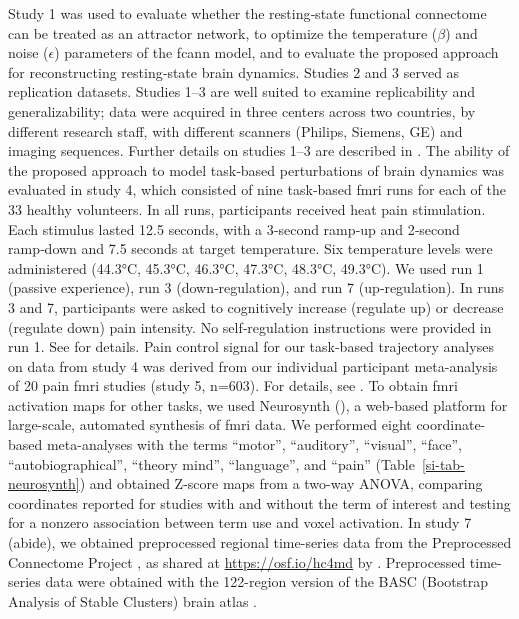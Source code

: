 \documentclass{article}
\begin{document}
Study 1 was used to evaluate whether the resting‑state functional connectome can be treated as an attractor network, to optimize the temperature ($\beta$) and noise ($\epsilon$) parameters of the \acrshort{fcann} model, and to evaluate the proposed approach for reconstructing resting‑state brain dynamics. Studies 2 and 3 served as replication datasets. Studies 1--3 are well suited to examine replicability and generalizability; data were acquired in three centers across two countries, by different research staff, with different scanners (Philips, Siemens, GE) and imaging sequences. Further details on studies 1--3 are described in \cite{Spisak2020Pain}. The ability of the proposed approach to model task‑based perturbations of brain dynamics was evaluated in study 4, which consisted of nine task‑based \acrshort{fmri} runs for each of the 33 healthy volunteers. In all runs, participants received heat pain stimulation. Each stimulus lasted 12.5 seconds, with a 3‑second ramp‑up and 2‑second ramp‑down and 7.5 seconds at target temperature. Six temperature levels were a\acrshort{dm}inistered (44.3°C, 45.3°C, 46.3°C, 47.3°C, 48.3°C, 49.3°C). We used run 1 (passive experience), run 3 (down‑regulation), and run 7 (up‑regulation). In runs 3 and 7, participants were asked to cognitively increase (regulate up) or decrease (regulate down) pain intensity. No self‑regulation instructions were provided in run 1. See \citet{woo2015distinct} for details.
Pain control signal for our task-based trajectory analyses on data from study 4 was derived from our individual participant meta-analysis of 20 pain \acrshort{fmri} studies (study 5, n=603). For details, see \citet{zunhammer2021meta}.
To obtain \acrshort{fmri} activation maps for other tasks, we used Neurosynth (\cite{Tor2011NeuroSynth}), a web-based platform for large-scale, automated synthesis of \acrshort{fmri} data. We performed eight coordinate-based meta-analyses with the terms ``motor'', ``auditory'', ``visual'', ``face'', ``autobiographical'', ``theory mind'', ``language'', and ``pain'' (Table~\ref{si-tab-neurosynth}) and obtained Z-score maps from a two-way ANOVA, comparing coordinates reported for studies with and without the term of interest and testing for a nonzero association between term use and voxel activation.
In study 7 (\acrshort{abide}), we obtained preprocessed regional time-series data from the Preprocessed Connectome Project \citep{craddock2013towards}, as shared at \href{https://osf.io/hc4md}{https://osf.io/hc4md} by \citet{dadi2019benchmarking}. Preprocessed time-series data were obtained with the 122-region version of the BASC (Bootstrap Analysis of Stable Clusters) brain atlas \citep{bellec2010multi}.
\end{document}
